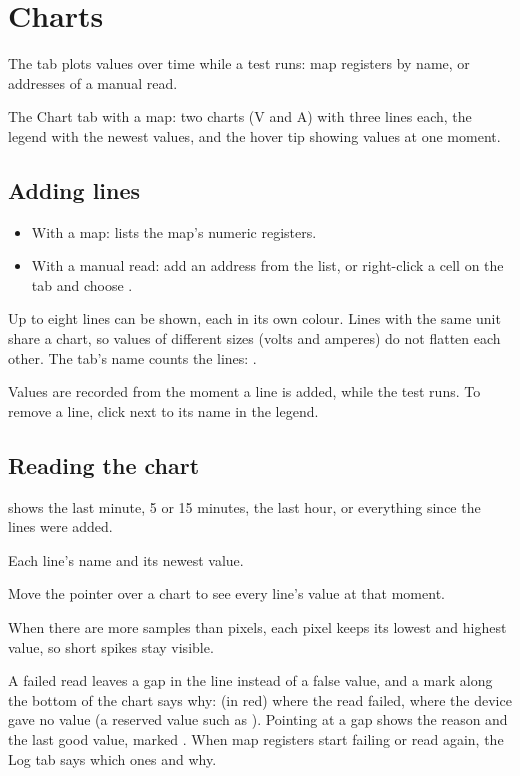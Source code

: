 \chapter{Charts}
\label{ch:charts}

The  tab plots values over time while a test runs: map registers
by name, or addresses of a manual read.

  {The Chart tab with a map: two charts (V and A) with three lines each, the
   legend with the newest values, and the hover tip showing values at one
   moment.}

\section{Adding lines}

\begin{itemize}
  \item With a map:  lists the map's
        numeric registers.
  \item With a manual read: add an address from the list, or right-click a
        cell on the  tab and choose .
\end{itemize}

Up to eight lines can be shown, each in its own colour. Lines with the same
unit share a chart, so values of different sizes (volts and amperes) do not
flatten each other. The tab's name counts the lines: .

Values are recorded from the moment a line is added, while the test runs. To
remove a line, click  next to its name in the legend.

\section{Reading the chart}

\begin{description}[style=nextline, leftmargin=0pt, font=\intermedium]
  \item[Time span]  shows the last minute, 5 or 15 minutes,
    the last hour, or everything since the lines were added.
  \item[Legend] Each line's name and its newest value.
  \item[Hover] Move the pointer over a chart to see every line's value at that
    moment.
  \item[Spikes] When there are more samples than pixels, each pixel keeps its
    lowest and highest value, so short spikes stay visible.
  \item[Gaps] A failed read leaves a gap in the line instead of a false value,
    and a mark along the bottom of the chart says why:  (in red) where
    the read failed, \ui{|} where the device gave no value (a reserved value
    such as ). Pointing at a gap shows the reason and the
    last good value, marked . When map registers start failing or
    read again, the Log tab says which ones and why.
\end{description}


